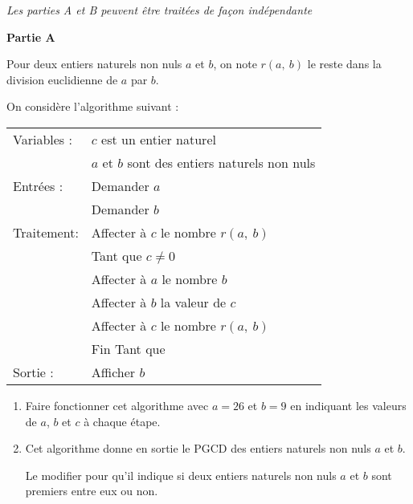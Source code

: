 \documentclass{cornouaille}
\begin{document}

\begin{exercice}

\emph{Les parties A et B peuvent être traitées de façon indépendante}

\medskip

\textbf{Partie A}

\medskip

Pour deux entiers naturels non nuls $a$ et $b$, on note $r(a,~b)$ le reste dans la division euclidienne de $a$ par $b$.

On considère l'algorithme suivant :

\begin{center}
\begin{tabularx}{0.7\linewidth}{|l|X|}\hline
Variables :	& $c$ est un entier naturel\\
			&$a$ et $b$ sont des entiers naturels non nuls\\
Entrées :	&Demander $a$\\
			&Demander $b$\\
Traitement:	&Affecter à $c$ le nombre $r(a,~b)$\\
			&Tant que $c \ne 0$\\
			&\hspace{0.5cm}Affecter à $a$ le nombre $b$\\
			&\hspace{0.5cm}Affecter à $b$ la valeur de $c$\\
			&\hspace{0.5cm}Affecter à $c$ le nombre $r(a,~b)$\\
			&Fin Tant que\\
Sortie :	&Afficher $b$\\ \hline
			\end{tabularx}
			\end{center}

\begin{enumerate}
\item Faire fonctionner cet algorithme avec $a = 26$ et $b = 9$ en indiquant les valeurs de $a$, $b$ et $c$ à chaque étape.
\item Cet algorithme donne en sortie le PGCD des entiers naturels non nuls $a$ et $b$.

Le modifier pour qu'il indique si deux entiers naturels non nuls $a$ et $b$ sont premiers entre
eux ou non.
\end{enumerate}


\end{exercice}
\end{document}
